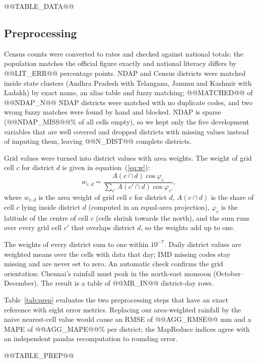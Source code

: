 \documentclass[conference]{IEEEtran}
\begin{document}
@@TABLE_DATA@@

\subsection{Preprocessing}
Census counts were converted to rates and checked against national totals: the population matches the official figure exactly and national literacy differs by @@LIT_ERR@@ percentage points. NDAP and Census districts were matched inside state clusters (Andhra Pradesh with Telangana, Jammu and Kashmir with Ladakh) by exact name, an alias table and fuzzy matching; @@MATCHED@@ of @@NDAP_N@@ NDAP districts were matched with no duplicate codes, and two wrong fuzzy matches were found by hand and blocked. NDAP is sparse (@@NDAP_MISS@@\% of all cells empty), so we kept only the five development variables that are well covered and dropped districts with missing values instead of imputing them, leaving @@N_DIST@@ complete districts.

Grid values were turned into district values with area weights. The weight of grid cell $c$ for district $d$ is given in equation~(\ref{eq:w}):
\begin{equation}\label{eq:w}
w_{c,d} = \frac{A(c \cap d)\cos\varphi_c}{\sum_{c'} A(c' \cap d)\cos\varphi_{c'}},
\end{equation}
\noindent where $w_{c,d}$ is the area weight of grid cell $c$ for district $d$, $A(c \cap d)$ is the share of cell $c$ lying inside district $d$ (computed in an equal-area projection), $\varphi_c$ is the latitude of the centre of cell $c$ (cells shrink towards the north), and the sum runs over every grid cell $c'$ that overlaps district $d$, so the weights add up to one.


The weights of every district sum to one within $10^{-7}$. Daily district values are weighted means over the cells with data that day; IMD missing codes stay missing and are never set to zero. An automatic check confirms the grid orientation: Chennai's rainfall must peak in the north-east monsoon (October--December). The result is a table of @@MR_IN@@ district-day rows.

Table~\ref{tab:prep} evaluates the two preprocessing steps that have an exact reference with eight error metrics. Replacing our area-weighted rainfall by the naive nearest-cell value would cause an RMSE of @@AGG_RMSE@@ mm and a MAPE of @@AGG_MAPE@@\% per district; the MapReduce indices agree with an independent pandas recomputation to rounding error.

@@TABLE_PREP@@
\end{document}
